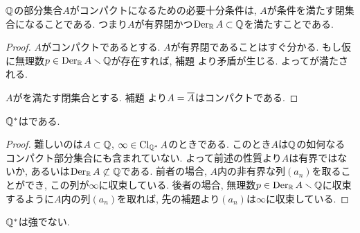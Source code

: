 \documentclass[uplatex, dvipdfmx, a4paper, 12pt, class=jsbook, crop=false]{standalone}
\begin{document}
\begin{proposition}
	$ \mathbb{Q} $の部分集合$ A $がコンパクトになるための必要十分条件は, $ A $が条件を満たす閉集合になることである. つまり$ A $が有界閉かつ$ \mathop{\mathrm{Der}}\nolimits_{\mathbb{R}} A \subset \mathbb{Q} $を満たすことである.
\end{proposition}
\begin{proof}
	$ A $がコンパクトであるとする. $ A $が有界閉であることはすぐ分かる. もし仮に無理数$ p \in \mathop{\mathrm{Der}}\nolimits_{\mathbb{R}} A \smallsetminus \mathbb{Q} $が存在すれば, 補題  より矛盾が生じる. よってが満たされる.

	$ A $がを満たす閉集合とする. 補題  より$ A = \overline{A} $はコンパクトである.
\end{proof}

\begin{property}
	$ \mathbb{Q}^\ast $は\Frechet である.
\end{property}
\begin{proof}
	難しいのは$ A \subset \mathbb{Q} $, $ \infty \in \mathop{\mathrm{Cl}}\nolimits_{\mathbb{Q}^\ast} A $のときである. このとき$ A $は$ \mathbb{Q} $の如何なるコンパクト部分集合にも含まれていない. よって前述の性質より$ A $は有界ではないか, あるいは$ \mathop{\mathrm{Der}}\nolimits_{\mathbb{R}} A \not\subset \mathbb{Q} $である. 前者の場合, $ A $内の非有界な列$ (a_n) $を取ることができ, この列が$ \infty $に収束している. 後者の場合, 無理数$ p \in \mathop{\mathrm{Der}}\nolimits_{\mathbb{R}} A \smallsetminus \mathbb{Q} $に収束するように$ A $内の列$ (a_n) $を取れば, 先の補題より$ (a_n) $は$ \infty $に収束している.
\end{proof}

\begin{property}
	$ \mathbb{Q}^\ast $は強\Frechet でない.
\end{property}
\end{document}
